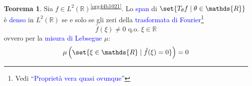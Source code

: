 \documentclass[10pt]{book}
\newcommand{\1}{\mathds{1}}
\newcommand{\R}{\mathds{R}}
\theoremstyle{definition}%
\newtheorem{thm}{Teorema}[section]
\theoremstyle{plain}
\theoremstyle{remark}
\renewcommand{\href}[2]{\textcolor{blue}{#2}}
\begin{document}
\begin{thm}
Sia \(f \in L^{2}(\R)\)\textsuperscript{\ref{org44b1021}}. Lo \href{../../../../../org/roam/20250630122400-span.org}{span} di \(\set{T_{\theta}f\mid \theta \in \R}\) è \href{../../../../../org/roam/20250301193045-sottoinsieme_denso.org}{denso} in \(L^{2}(\R)\) se e solo se gli zeri della \href{../../../../../org/roam/20250630121906-trasformata_di_fourier.org}{trasformata di Fourier}\footnote{Vedi ``\href{../../../../../org/roam/20250630122745-proprieta_vera_quasi_ovunque.org}{Proprietà vera quasi ovunque}''}
\begin{equation*}
\hat{f}(\xi) \neq 0\text{ q.o. }\xi \in \R
\end{equation*}
ovvero per la \href{../../../../../org/roam/20250630122824-misura_di_lebesgue.org}{misura di Lebsegue} \(\mu\):
\begin{equation*}
\mu\left(\set{\xi \in \R\mid \hat{f}(\xi) = 0}\right) = 0
\end{equation*}
\label{teo:wt2}
\end{thm}
\end{document}
